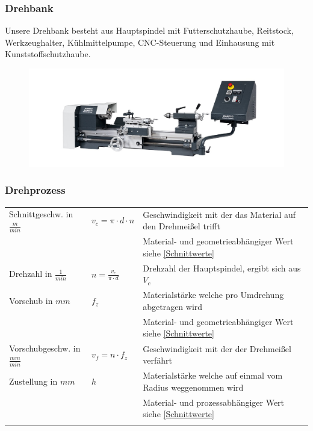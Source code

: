 \documentclass{\basedir/fablab-document}
\begin{document}
\subsubsection{Drehbank}
Unsere Drehbank besteht aus Hauptspindel mit Futterschutzhaube, Reitstock, Werkzeughalter, Kühlmittelpumpe, CNC-Steuerung und Einhausung mit Kunststoffschutzhaube.
\begin{figure}[ht]
\centering
\includegraphics[width = 0.9\linewidth]{img/drehbank} \\
\end{figure}


\subsubsection{Drehprozess}
\begin{tabular}{lll}
    Schnittgeschw. in $\frac{m}{min}$ 					& $v_c = \pi \cdot d \cdot n $ 			& Geschwindigkeit mit der das Material auf den Drehmeißel trifft 	\\ 
																								&																		& Material- und geometrieabhängiger Wert siehe \ref{Schnittwerte} \\ \addlinespace
		Drehzahl in $\frac{1}{min}$ 								& $ n = \frac{v_c}{\pi \cdot d} $		& Drehzahl der Hauptspindel, ergibt sich aus $V_c$								\\ \addlinespace
		Vorschub in $mm$ 														& $ f_z $  													& Materialstärke welche pro Umdrehung abgetragen wird 						\\
																								&																		& Material- und geometrieabhängiger Wert siehe \ref{Schnittwerte} \\ \addlinespace
		Vorschubgeschw. in $\frac{mm}{min}$ 				& $ v_f = n \cdot f_z $ 						& Geschwindigkeit mit der der Drehmeißel verfährt			 						\\ \addlinespace
		Zustellung in $mm$ 													& $ h  $  													& Materialstärke welche auf einmal vom Radius weggenommen wird		\\
																								&																		& Material- und prozessabhängiger Wert siehe \ref{Schnittwerte} 	\\ \addlinespace
\end{tabular}
\end{document}
